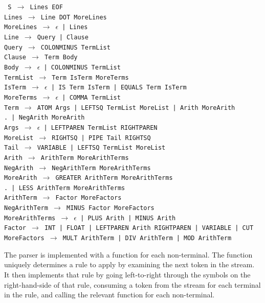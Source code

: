 \documentclass[12pt]{article}
\begin{document}
\texttt{
S $\rightarrow$ Lines EOF\\
Lines $\rightarrow$ Line DOT MoreLines\\
MoreLines $\rightarrow$ $\epsilon$ | Lines\\
Line $\rightarrow$ Query | Clause\\
Query $\rightarrow$ COLONMINUS TermList\\
Clause $\rightarrow$ Term Body\\
Body $\rightarrow$ $\epsilon$ | COLONMINUS TermList\\
TermList $\rightarrow$ Term IsTerm MoreTerms\\
IsTerm $\rightarrow$ $\epsilon$ | IS Term IsTerm | EQUALS Term IsTerm\\
MoreTerms $\rightarrow$ $\epsilon$ | COMMA TermList\\
Term $\rightarrow$ ATOM Args | LEFTSQ TermList MoreList | Arith MoreArith\\
.\hspace{20px} | NegArith MoreArith \\
Args $\rightarrow$ $\epsilon$ | LEFTPAREN TermList RIGHTPAREN\\
MoreList $\rightarrow$ RIGHTSQ | PIPE Tail RIGHTSQ\\
Tail $\rightarrow$ VARIABLE | LEFTSQ TermList MoreList\\
Arith $\rightarrow$ ArithTerm MoreArithTerms\\
NegArith $\rightarrow$ NegArithTerm MoreArithTerms\\
MoreArith $\rightarrow$ GREATER ArithTerm MoreArithTerms\\
.\hspace{50px} | LESS ArithTerm MoreArithTerms \\
ArithTerm $\rightarrow$ Factor MoreFactors\\
NegArithTerm $\rightarrow$ MINUS Factor MoreFactors\\
MoreArithTerms $\rightarrow$ $\epsilon$ | PLUS Arith | MINUS Arith\\
Factor $\rightarrow$ INT | FLOAT | LEFTPAREN Arith RIGHTPAREN | VARIABLE | CUT\\
MoreFactors $\rightarrow$ MULT ArithTerm | DIV ArithTerm | MOD ArithTerm
}

The parser is implemented with a function for each non-terminal. 
The function uniquely determines a rule to apply by examining the next token in the stream. 
It then implements that rule by going left-to-right through the symbols on the right-hand-side of that rule, consuming a token from the stream for each terminal in the rule, and calling the relevant function for each non-terminal.
\end{document}
